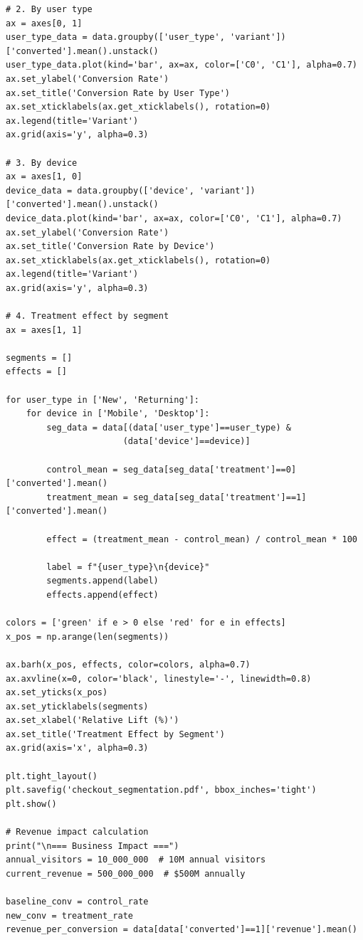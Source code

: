 \begin{lstlisting}
# 2. By user type
ax = axes[0, 1]
user_type_data = data.groupby(['user_type', 'variant'])['converted'].mean().unstack()
user_type_data.plot(kind='bar', ax=ax, color=['C0', 'C1'], alpha=0.7)
ax.set_ylabel('Conversion Rate')
ax.set_title('Conversion Rate by User Type')
ax.set_xticklabels(ax.get_xticklabels(), rotation=0)
ax.legend(title='Variant')
ax.grid(axis='y', alpha=0.3)

# 3. By device
ax = axes[1, 0]
device_data = data.groupby(['device', 'variant'])['converted'].mean().unstack()
device_data.plot(kind='bar', ax=ax, color=['C0', 'C1'], alpha=0.7)
ax.set_ylabel('Conversion Rate')
ax.set_title('Conversion Rate by Device')
ax.set_xticklabels(ax.get_xticklabels(), rotation=0)
ax.legend(title='Variant')
ax.grid(axis='y', alpha=0.3)

# 4. Treatment effect by segment
ax = axes[1, 1]

segments = []
effects = []

for user_type in ['New', 'Returning']:
    for device in ['Mobile', 'Desktop']:
        seg_data = data[(data['user_type']==user_type) &
                       (data['device']==device)]

        control_mean = seg_data[seg_data['treatment']==0]['converted'].mean()
        treatment_mean = seg_data[seg_data['treatment']==1]['converted'].mean()

        effect = (treatment_mean - control_mean) / control_mean * 100

        label = f"{user_type}\n{device}"
        segments.append(label)
        effects.append(effect)

colors = ['green' if e > 0 else 'red' for e in effects]
x_pos = np.arange(len(segments))

ax.barh(x_pos, effects, color=colors, alpha=0.7)
ax.axvline(x=0, color='black', linestyle='-', linewidth=0.8)
ax.set_yticks(x_pos)
ax.set_yticklabels(segments)
ax.set_xlabel('Relative Lift (%)')
ax.set_title('Treatment Effect by Segment')
ax.grid(axis='x', alpha=0.3)

plt.tight_layout()
plt.savefig('checkout_segmentation.pdf', bbox_inches='tight')
plt.show()

# Revenue impact calculation
print("\n=== Business Impact ===")
annual_visitors = 10_000_000  # 10M annual visitors
current_revenue = 500_000_000  # $500M annually

baseline_conv = control_rate
new_conv = treatment_rate
revenue_per_conversion = data[data['converted']==1]['revenue'].mean()


\end{lstlisting}
